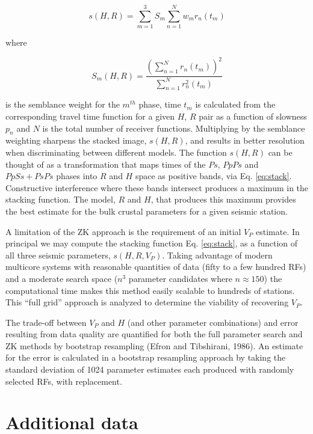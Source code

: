 \documentclass[msc,oneside]{ubcthesis}
\begin{document}
\begin{equation}  \label{eq:stack}
s(H,R) = \sum_{m=1}^{3} S_m \sum_{n=1}^N w_mr_n(t_m)
\end{equation}

\noindent where

\begin{equation}
S_m(H,R) = \frac {\left( \sum_{n=1}^N r_n(t_m) \right)^2}
                 { \sum_{n=1}^N r_n^2(t_m) }
\end{equation}

\noindent is the semblance weight for the $m^{th}$ phase, time $t_m$ is calculated from the corresponding travel time function for a given $H$, $R$ pair as a function of slowness $p_n$ and $N$ is the total number of receiver functions. Multiplying by the semblance weighting sharpens the stacked image, $s(H,R)$, and results in better resolution when discriminating between different models. The function $s(H,R)$ can be thought of as a transformation that maps times of the $Ps$, $PpPs$ and $PpSs+PsPs$ phases into $R$ and $H$ space as positive bands, via Eq. \ref{eq:stack}. Constructive interference where these bands intersect produces a maximum in the stacking function. The model, $R$ and $H$, that produces this maximum provides the best estimate for the bulk crustal parameters for a given seismic station.

A limitation of the ZK approach is the requirement of an initial $V_P$ estimate. In principal we may compute the stacking function Eq. \ref{eq:stack}, as a function of all three seismic parameters, $s(H,R,V_P)$. Taking advantage of modern multicore systems with reasonable quantities of data (fifty to a few hundred RFs) and a moderate search space ($n^3$ parameter candidates where $n \approx 150$) the computational time makes this method easily scalable to hundreds of stations. This ``full grid'' approach is analyzed to determine the viability of recovering $V_P$.

The trade-off between $V_P$ and $H$ (and other parameter combinations) and error resulting from data quality are quantified for both the full parameter search and ZK methods by bootstrap resampling (Efron and Tibshirani, 1986). An estimate for the error is calculated in a bootstrap resampling approach by taking the standard deviation of 1024 parameter estimates each produced with randomly selected RFs, with replacement.




\section{Additional data}
\end{document}
